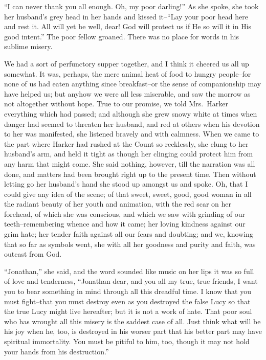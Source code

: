\documentclass[12pt,openright]{book}
\begin{document}
“I can never thank you all enough. Oh, my poor darling!” As she spoke, she took her husband’s grey head in her hands and kissed it–“Lay your poor head here and rest it. All will yet be well, dear! God will protect us if He so will it in His good intent.” The poor fellow groaned. There was no place for words in his sublime misery.

We had a sort of perfunctory supper together, and I think it cheered us all up somewhat. It was, perhaps, the mere animal heat of food to hungry people–for none of us had eaten anything since breakfast–or the sense of companionship may have helped us; but anyhow we were all less miserable, and saw the morrow as not altogether without hope. True to our promise, we told Mrs. Harker everything which had passed; and although she grew snowy white at times when danger had seemed to threaten her husband, and red at others when his devotion to her was manifested, she listened bravely and with calmness. When we came to the part where Harker had rushed at the Count so recklessly, she clung to her husband’s arm, and held it tight as though her clinging could protect him from any harm that might come. She said nothing, however, till the narration was all done, and matters had been brought right up to the present time. Then without letting go her husband’s hand she stood up amongst us and spoke. Oh, that I could give any idea of the scene; of that sweet, sweet, good, good woman in all the radiant beauty of her youth and animation, with the red scar on her forehead, of which she was conscious, and which we saw with grinding of our teeth–remembering whence and how it came; her loving kindness against our grim hate; her tender faith against all our fears and doubting; and we, knowing that so far as symbols went, she with all her goodness and purity and faith, was outcast from God.

“Jonathan,” she said, and the word sounded like music on her lips it was so full of love and tenderness, “Jonathan dear, and you all my true, true friends, I want you to bear something in mind through all this dreadful time. I know that you must fight–that you must destroy even as you destroyed the false Lucy so that the true Lucy might live hereafter; but it is not a work of hate. That poor soul who has wrought all this misery is the saddest case of all. Just think what will be his joy when he, too, is destroyed in his worser part that his better part may have spiritual immortality. You must be pitiful to him, too, though it may not hold your hands from his destruction.”
\end{document}
